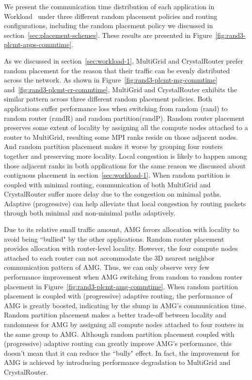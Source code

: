 We present the communication time distribution of each application in Workload~ under
three different random placement policies and routing configurations, including the random placement policy we discussed in section~\ref{sec:placement-schemes}. These results are presented in Figure~\ref{fig:rand3-plcmt-apps-commtime}. 

As we discussed in section~\ref{sec:workload-1}, MultiGrid and CrystalRouter prefer random placement for the reason that their traffic can be evenly distributed across the network. 
As shown in Figure~\ref{fig:rand3-plcmt-mg-commtime} and~\ref{fig:rand3-plcmt-cr-commtime}, MultiGrid and CrystalRouter exhibits the similar pattern across three different random placement policies. Both applications suffer performance loss when switching from random (rand) to random router (randR) and random partition(randP).
Random router placement preserves some extent of locality by assigning all the compute nodes attached to a router to MultiGrid, resulting some MPI ranks reside on those adjacent nodes. 
And random partition placement makes it worse by grouping four routers together and preserving more locality.
Local congestion is likely to happen among those adjacent ranks in both applications for the same reason we discussed about contiguous placement in section~\ref{sec:workload-1}. 
When random partition is coupled with minimal routing, communication of both MultiGrid and CrystalRouter suffer more delay due to the congestion on minimal paths. 
Adaptive (progressive) can help alleviate that local congestion by routing packets through both minimal and non-minimal paths adaptively. 

Due to its relative small traffic amount, AMG favors allocation with locality to avoid being ``bullied" by the other applications. 
Random router placement provides allocation with router-level locality. 
However, the four compute nodes attached to each router can not accommodate the 3D nearest neighbor communication pattern of AMG. 
Thus, we can only observe very few performance improvement when AMG switching from random to random router placement in Figure~\ref{fig:rand3-plcmt-amg-commtime}.
When random partition placement is coupled with (progressive) adaptive routing, the performance of AMG is greatly boosted, indicating by the slump in AMG's communication time. 
Random partition placement makes a better trade-off between locality and randomness for AMG by assigning all compute nodes attached to four routers in the same group to AMG. 
Although random partition placement coupled with (progressive) adaptive routing can greatly improve AMG's performance, this doesn't mean that it can reduce the ``bully" effect. 
In fact, the improvement for AMG is achieved by introducing performance degradation to MultiGrid and CrystalRouter. 



